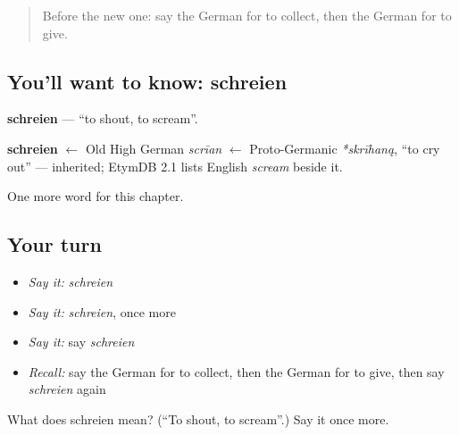 \begin{quote}
Before the new one: say the German for to collect, then the German for to give.
\end{quote}

\subsection*{You'll want to know: schreien}
\textbf{schreien} — \textquotedblleft{}to shout, to scream\textquotedblright{}.

\begin{cousinweb}
\textbf{schreien} $\leftarrow$ Old High German \emph{scrīan} $\leftarrow$ Proto-Germanic \emph{*skrīhaną}, \textquotedblleft{}to cry out\textquotedblright{} — inherited; EtymDB 2.1 lists English \emph{scream} beside it.
\end{cousinweb}

\begin{grammarlens}[title={What you've built}]
One more word for this chapter.
\end{grammarlens}

\subsection*{Your turn}
\begin{itemize}
\raggedright
  \item \emph{Say it:} \emph{schreien}
  \item \emph{Say it:} \emph{schreien}, once more
  \item \emph{Say it:} say \emph{schreien}
  \item \emph{Recall:} say the German for to collect, then the German for to give, then say \emph{schreien} again
\end{itemize}

\begin{tcolorbox}[breakable,colback=teal!4,colframe=teal!35!black,title={Before you move on}]
What does schreien mean? (\textquotedblleft{}To shout, to scream\textquotedblright{}.) Say it once more.
\end{tcolorbox}
